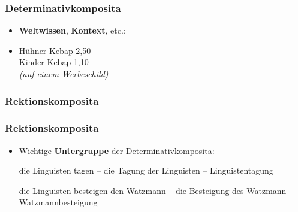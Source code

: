 \begin{frame}
\frametitle{Determinativkomposita}

\begin{itemize}
	\item \textbf{Weltwissen}, \textbf{Kontext}, etc.:
	\item [] Hühner Kebap 2,50\\
	Kinder Kebap 1,10\\
	\emph{(auf einem Werbeschild)}
\end{itemize}


\end{frame}


\subsubsection{Rektionskomposita}


\begin{frame}
\frametitle{Rektionskomposita}

\begin{itemize}
	\item Wichtige \textbf{Untergruppe} der Determinativkomposita:
	
	\ea \label{ex:Bsp1} die Linguisten tagen – die Tagung der Linguisten – Linguistentagung
	\z
	
	\ea \label{ex:Bsp2} die Linguisten besteigen den Watzmann – die Besteigung des Watzmann – Watzmannbesteigung
	\z
		 
\end{itemize}


\end{frame}


